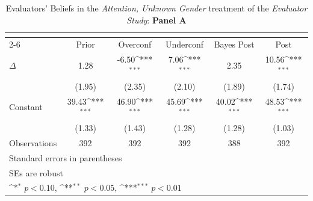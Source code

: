 \begin{table}[htbp]\centering
\def\sym#1{\ifmmode^{#1}\else\(^{#1}\)\fi}
\caption{Evaluators' Beliefs in the \textit{Attention, Unknown Gender} treatment of the \textit{Evaluator Study}: \textbf{Panel A}}
\begin{tabular}{l*{5}{c}}
\hline\hline
                &\multicolumn{5}{c}{}                                                                          \\\cmidrule(lr){2-6}
                &\multicolumn{1}{c}{Prior}&\multicolumn{1}{c}{Overconf}&\multicolumn{1}{c}{Underconf}&\multicolumn{1}{c}{Bayes Post}&\multicolumn{1}{c}{Post}\\
\hline
$\Delta$        &     1.28         &    -6.50\sym{***}&     7.06\sym{***}&     2.35         &    10.56\sym{***}\\
                &   (1.95)         &   (2.35)         &   (2.10)         &   (1.89)         &   (1.74)         \\
Constant        &    39.43\sym{***}&    46.90\sym{***}&    45.69\sym{***}&    40.02\sym{***}&    48.53\sym{***}\\
                &   (1.33)         &   (1.43)         &   (1.28)         &   (1.28)         &   (1.03)         \\
\hline
Observations    &      392         &      392         &      392         &      388         &      392         \\
\hline\hline
\multicolumn{6}{l}{\footnotesize Standard errors in parentheses}\\
\multicolumn{6}{l}{\footnotesize SEs are robust}\\
\multicolumn{6}{l}{\footnotesize \sym{*} \(p<0.10\), \sym{**} \(p<0.05\), \sym{***} \(p<0.01\)}\\
\end{tabular}
\end{table}
